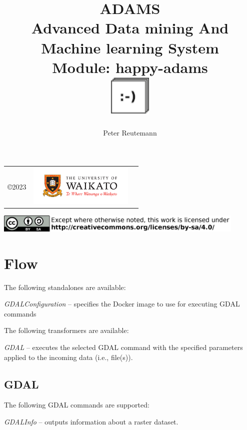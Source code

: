 \documentclass[a4paper]{book}
\title{
  \textbf{ADAMS} \\
  {\Large \textbf{A}dvanced \textbf{D}ata mining \textbf{A}nd \textbf{M}achine
  learning \textbf{S}ystem} \\
  {\Large Module: happy-adams} \\
  \vspace{1cm}
  \includegraphics[width=2cm]{images/happy-adams-module.png} \\
}
\author{
  Peter Reutemann
}
\begin{document}
\begin{titlepage}
\maketitle

\thispagestyle{empty}
\center
\begin{table}[b]
	\begin{tabular}{c l l}
		\parbox[c][2cm]{2cm}{\copyright 2023} &
		\parbox[c][2cm]{5cm}{\includegraphics[width=5cm]{images/coat_of_arms.pdf}} \\
	\end{tabular}
	\includegraphics[width=12cm]{images/cc.png} \\
\end{table}

\end{titlepage}

\tableofcontents

\chapter{Flow}
The following standalones are available:
\begin{tight_itemize}
  \item \textit{GDALConfiguration} -- specifies the Docker image to use for executing GDAL commands
\end{tight_itemize}
The following transformers are available:
\begin{tight_itemize}
  \item \textit{GDAL} -- executes the selected GDAL command with the specified parameters applied to the incoming data (i.e., file(s)).
\end{tight_itemize}


\section{GDAL}
The following GDAL commands are supported:
\begin{tight_itemize}
  \item \textit{GDALInfo} -- outputs information about a raster dataset.
\end{tight_itemize}
\end{document}
